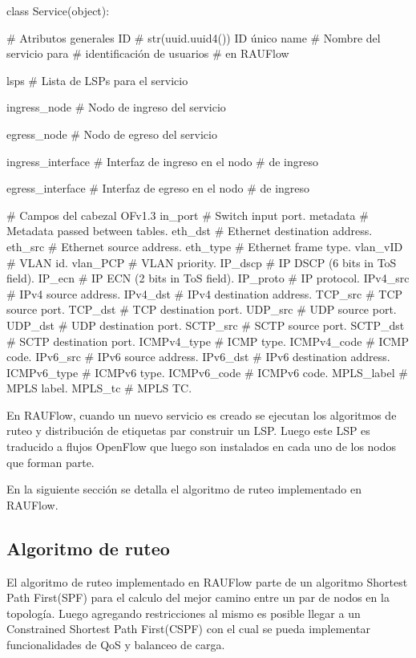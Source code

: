\begin{python}
class Service(object):

		# Atributos generales
		ID 				    # str(uuid.uuid4()) ID \'unico  
		name 				# Nombre del servicio para 
							# identificaci\'on de usuarios 
							# en RAUFlow
							
		lsps				# Lista de LSPs para el servicio
		
		ingress_node		# Nodo de ingreso del servicio
							
		egress_node 		# Nodo de egreso del servicio
							
		ingress_interface 	# Interfaz de ingreso en el nodo 
							# de ingreso
							
		egress_interface 	# Interfaz de egreso en el nodo 
							# de ingreso 
        
		# Campos del cabezal OFv1.3 
		in_port			# Switch input port. 
		metadata 		# Metadata passed between tables. 
		eth_dst 		# Ethernet destination address.
		eth_src 		# Ethernet source address. 
		eth_type 		# Ethernet frame type. 
		vlan_vID 		# VLAN id. 
		vlan_PCP		# VLAN priority. 
		IP_dscp 		# IP DSCP (6 bits in ToS field). 
		IP_ecn  		# IP ECN (2 bits in ToS field). 
		IP_proto		# IP protocol. 
		IPv4_src 		# IPv4 source address. 
		IPv4_dst 		# IPv4 destination address. 
		TCP_src 		# TCP source port. 
		TCP_dst 		# TCP destination port. 
		UDP_src 		# UDP source port. 
		UDP_dst 		# UDP destination port. 
		SCTP_src 		# SCTP source port. 
		SCTP_dst 		# SCTP destination port. 
		ICMPv4_type 	# ICMP type. 
		ICMPv4_code 	# ICMP code. 
		IPv6_src 		# IPv6 source address. 
		IPv6_dst 		# IPv6 destination address. 
		ICMPv6_type 	# ICMPv6 type. 
		ICMPv6_code 	# ICMPv6 code. 
		MPLS_label 		# MPLS label. 
		MPLS_tc 		# MPLS TC. 
		
\end{python}

En RAUFlow, cuando un nuevo servicio es creado se ejecutan los algoritmos de ruteo y distribución de etiquetas par construir un LSP. Luego este LSP es traducido a flujos OpenFlow que luego son instalados en cada uno de los nodos que forman parte. 

En la siguiente secci\'on se detalla el algoritmo de ruteo implementado en RAUFlow.

\subsection{Algoritmo de ruteo}
El algoritmo de ruteo implementado en RAUFlow parte de un algoritmo Shortest Path First(SPF) para el calculo del mejor camino entre un par de nodos en la topolog\'ia. Luego agregando restricciones al mismo es posible llegar a un Constrained Shortest Path First(CSPF) con el cual se pueda implementar funcionalidades de QoS y balanceo de carga.

